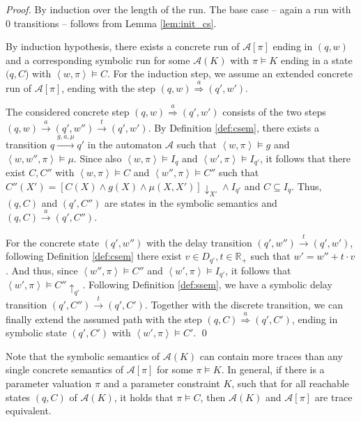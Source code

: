 \documentclass{llncs}
\newcommand{\A}{\ensuremath{\mathcal{A}}}
\newcommand{\Reals}{\ensuremath{\mathbb{R}}}
\newcommand{\trans}[1]{\ensuremath{\overset{#1}{\rightarrow}}}
\newcommand{\Trans}[1]{\ensuremath{\overset{#1}{\Rightarrow}}}
\newcommand{\project}[1]{\ensuremath{\downarrow_{#1}}}
\newcommand{\telapse}{\ensuremath{\uparrow}}
\begin{document}
\begin{proof}
  By induction over the length of the run. The base case -- again a
  run with 0 transitions -- follows from Lemma \ref{lem:init_cs}.

  By induction hypothesis, there exists a concrete run of $\A[\pi]$
  ending in $(q,w)$ and a corresponding symbolic run for some $\A(K)$
  with $\pi \models K$ ending in a state $(q,C$) with
  $\left<w,\pi\right> \models C$.  For the induction step, we assume an
  extended concrete run of $\A[\pi]$, ending with the step $(q,w) \Trans{a}
  (q',w')$.

  The considered concrete step $(q,w) \Trans{a} (q',w')$ consists of
  the two steps $(q,w) \trans{a} (q',w'') \trans{t} (q',w')$. By
  Definition \ref{def:csem}, there exists a transition $q
  \xrightarrow{g,a,\mu} q'$ in the automaton $\A$ such that
  $\left<w, \pi\right> \models g$ and $\left<w,w'',\pi\right> \models
  \mu$. Since also $\left<w,\pi\right> \models I_q$ and
  $\left<w',\pi\right> \models I_{q'}$, it follows that there exist
  $C,C''$ with $\left<w, \pi\right> \models C$ and
  $\left<w'',\pi\right> \models C''$ such that $C''(X') = \left[ C(X)
    \wedge g(X) \wedge \mu(X,X') \right] \project{X'} \wedge I_{q'}$
  and $C \subseteq I_q$. Thus, $(q,C)$ and $(q',C'')$ are states in
  the symbolic semantics and $(q,C) \trans{a} (q',C'')$.

  For the concrete state $(q', w'')$ with the delay transition $(q',
  w'') \trans{t} (q',w')$, following Definition \ref{def:csem} there
  exist $v \in D_{q'}, t \in \Reals_+$ such that $w' = w'' + t
  \cdot v$. And thus, since $\left<w'', \pi\right> \models C''$ and
  $\left<w', \pi\right> \models I_{q'}$, it follows that $\left<w',
    \pi\right> \models C'' \telapse_{q'}$. Following Definition
  \ref{def:ssem}, we have a symbolic delay transition $(q', C'')
  \trans{t} (q', C')$. Together with the discrete transition, we can
  finally extend the assumed path with the step $(q, C) \Trans{a} (q',
  C')$, ending in symbolic state $(q', C')$ with $\left<w', \pi\right>
  \models C'$.  \qed
\end{proof}

Note that the symbolic semantics of $\A(K)$ can contain more traces
than any single concrete semantics of $\A[\pi]$ for some $\pi \models
K$. In general, if there is a parameter valuation $\pi$ and a
parameter constraint $K$, such that for all reachable states $(q,C)$
of $\A(K)$, it holds that $\pi \models C$, then $\A(K)$ and $\A[\pi]$
are trace equivalent.
\end{document}
